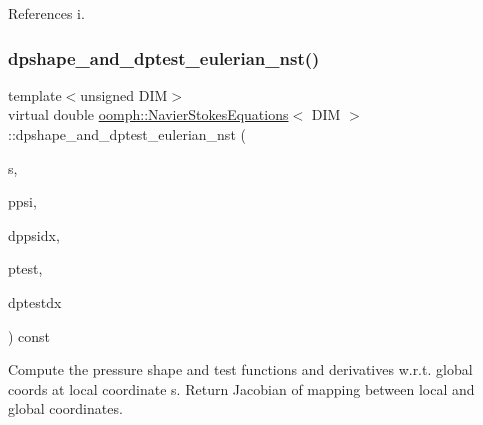 References i.

\mbox{\label{classoomph_1_1NavierStokesEquations_a2f3024a4d370ec45ddffacb236bc2bb2}} 
\subsubsection{\texorpdfstring{dpshape\+\_\+and\+\_\+dptest\+\_\+eulerian\+\_\+nst()}{dpshape\_and\_dptest\_eulerian\_nst()}}
{\footnotesize\ttfamily template$<$unsigned D\+IM$>$ \\
virtual double \hyperlink{classoomph_1_1NavierStokesEquations}{oomph\+::\+Navier\+Stokes\+Equations}$<$ D\+IM $>$\+::dpshape\+\_\+and\+\_\+dptest\+\_\+eulerian\+\_\+nst (\begin{DoxyParamCaption}\item[{const \hyperlink{classoomph_1_1Vector}{Vector}$<$ double $>$ \&}]{s,  }\item[{\hyperlink{classoomph_1_1Shape}{Shape} \&}]{ppsi,  }\item[{\hyperlink{classoomph_1_1DShape}{D\+Shape} \&}]{dppsidx,  }\item[{\hyperlink{classoomph_1_1Shape}{Shape} \&}]{ptest,  }\item[{\hyperlink{classoomph_1_1DShape}{D\+Shape} \&}]{dptestdx }\end{DoxyParamCaption}) const\hspace{0.3cm}{\ttfamily [pure virtual]}}



Compute the pressure shape and test functions and derivatives w.\+r.\+t. global coords at local coordinate s. Return Jacobian of mapping between local and global coordinates. 



